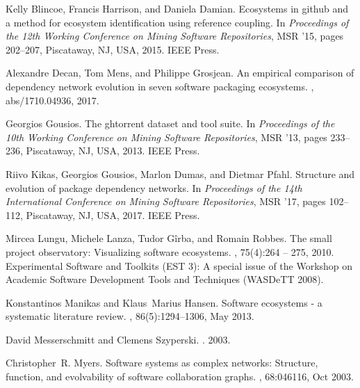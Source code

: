 \documentclass[10pt,conference]{IEEEtran}
\begin{document}
  \begin{thebibliography}{00}

    Kelly Blincoe, Francis Harrison, and Daniela Damian.
    \newblock Ecosystems in github and a method for ecosystem identification using
    reference coupling.
    \newblock In {\em Proceedings of the 12th Working Conference on Mining Software
    Repositories}, MSR '15, pages 202--207, Piscataway, NJ, USA, 2015. IEEE
    Press.

    Alexandre Decan, Tom Mens, and Philippe Grosjean.
    \newblock An empirical comparison of dependency network evolution in seven
    software packaging ecosystems.
    , abs/1710.04936, 2017.

    Georgios Gousios.
    \newblock The ghtorrent dataset and tool suite.
    \newblock In {\em Proceedings of the 10th Working Conference on Mining Software
    Repositories}, MSR '13, pages 233--236, Piscataway, NJ, USA, 2013. IEEE
    Press.

    Riivo Kikas, Georgios Gousios, Marlon Dumas, and Dietmar Pfahl.
    \newblock Structure and evolution of package dependency networks.
    \newblock In {\em Proceedings of the 14th International Conference on Mining
    Software Repositories}, MSR '17, pages 102--112, Piscataway, NJ, USA, 2017.
    IEEE Press.

    Mircea Lungu, Michele Lanza, Tudor Gîrba, and Romain Robbes.
    \newblock The small project observatory: Visualizing software ecosystems.
    , 75(4):264 -- 275, 2010.
    \newblock Experimental Software and Toolkits (EST 3): A special issue of the
    Workshop on Academic Software Development Tools and Techniques (WASDeTT
    2008).

    Konstantinos Manikas and Klaus~Marius Hansen.
    \newblock Software ecosystems - a systematic literature review.
    , 86(5):1294--1306, May 2013.

    David Messerschmitt and Clemens Szyperski.
    .
     2003.

    Christopher~R. Myers.
    \newblock Software systems as complex networks: Structure, function, and
    evolvability of software collaboration graphs.
    , 68:046116, Oct 2003.


\end{thebibliography}
\end{document}
